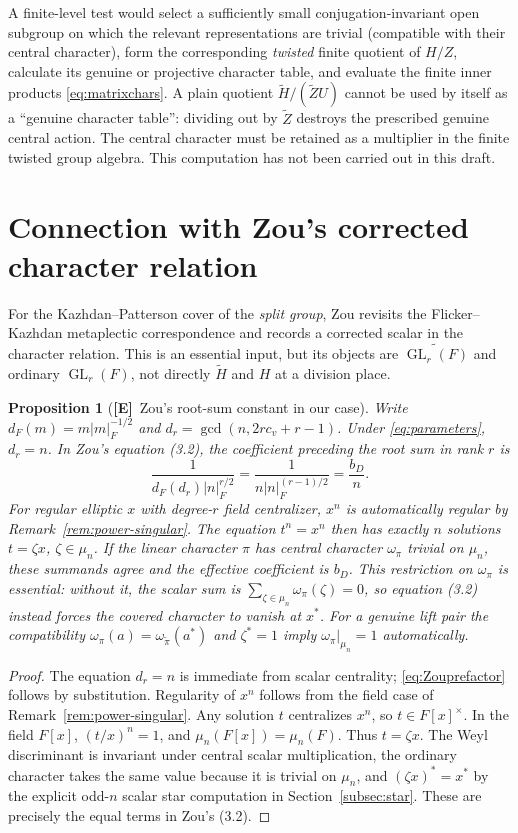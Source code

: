 \documentclass[11pt]{article}
\newcommand{\GL}{\operatorname{GL}}
\newcommand{\tH}{\widetilde H}
\newcommand{\tZ}{\widetilde Z}
\newcommand{\Etag}{\textnormal{\textbf{[E]}}}
\theoremstyle{plain}
\newtheorem{proposition}[theorem]{Proposition}
\theoremstyle{definition}
\begin{document}
A finite-level test would select a sufficiently small
conjugation-invariant open subgroup on which the relevant
representations are trivial (compatible with their central
character), form the corresponding \emph{twisted} finite quotient
of $H/Z$, calculate its genuine or projective character table,
and evaluate the finite inner products \eqref{eq:matrixchars}.
A plain quotient $\tH/(\tZ U)$ cannot be used by itself as a
``genuine character table'': dividing out by $\tZ$ destroys the
prescribed genuine central action.  The central character must be
retained as a multiplier in the finite twisted group algebra.
This computation has not been carried out in this draft.

\section{Connection with Zou's corrected character relation}\label{sec:Zou}
For the Kazhdan--Patterson cover of the \emph{split group},
Zou \cite[\S3]{Zou24} revisits the Flicker--Kazhdan metaplectic
correspondence and records a corrected scalar in the character
relation.  This is an essential input, but its objects are
$\widetilde{\GL_r(F)}$ and ordinary $\GL_r(F)$, not directly
$\tH$ and $H$ at a division place.

\begin{proposition}[\Etag\ Zou's root-sum constant in our case]\label{prop:Zouconstant}
Write $d_F(m)=m|m|_F^{-1/2}$ and
$d_r=\gcd(n,2rc_v+r-1)$.  Under \eqref{eq:parameters},
$d_r=n$.  In Zou's equation (3.2), the coefficient preceding
the root sum in rank $r$ is
\begin{equation}\label{eq:Zouprefactor}
 \frac{1}{d_F(d_r)|n|_F^{r/2}}
 =\frac{1}{n|n|_F^{(r-1)/2}}=\frac{b_D}{n}.
\end{equation}
For regular elliptic $x$ with degree-$r$ field centralizer,
$x^n$ is automatically regular by Remark~\ref{rem:power-singular}.
The equation $t^n=x^n$ then has exactly $n$ solutions
$t=\zeta x$, $\zeta\in\mu_n$.  If the linear character
$\pi$ has central character $\omega_\pi$ trivial on $\mu_n$,
these summands agree and the effective coefficient is $b_D$.
This restriction on $\omega_\pi$ is essential: without it, the
scalar sum is $\sum_{\zeta\in\mu_n}\omega_\pi(\zeta)=0$,
so equation (3.2) instead forces the covered character to vanish
at $x^*$.  For a genuine lift pair the compatibility
$\omega_\pi(a)=\omega_{\widetilde\pi}(a^*)$
and $\zeta^*=1$ imply $\omega_\pi|_{\mu_n}=1$ automatically.
\end{proposition}
\begin{proof}
The equation $d_r=n$ is immediate from scalar centrality;
\eqref{eq:Zouprefactor} follows by substitution.  Regularity of
$x^n$ follows from the field case of Remark~\ref{rem:power-singular}.
Any solution $t$ centralizes $x^n$, so $t\in F[x]^\times$.  In the field $F[x]$, $(t/x)^n=1$,
and $\mu_n(F[x])=\mu_n(F)$.  Thus $t=\zeta x$.
The Weyl discriminant is invariant under central scalar
multiplication, the ordinary character takes the same value
because it is trivial on $\mu_n$, and $(\zeta x)^*=x^*$
by the explicit odd-$n$ scalar star computation in
Section~\ref{subsec:star}.
These are precisely the equal terms in Zou's (3.2).
\end{proof}
\end{document}
